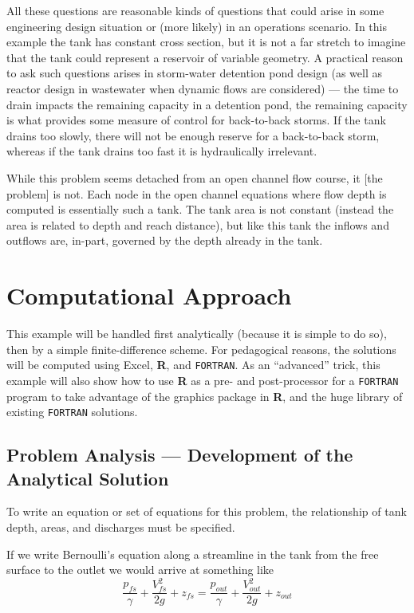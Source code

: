 \documentclass[12pt]{article}
\begin{document}
All these questions are reasonable kinds of questions that could arise in some engineering design situation or (more likely) in an operations scenario. In this example the tank has constant cross section, but it is not a far stretch to imagine that the tank could represent a reservoir of variable geometry.  A practical reason to ask such questions arises in storm-water detention pond design (as well as reactor design in wastewater when dynamic flows are considered) --- the time to drain impacts the remaining capacity in a detention pond, the remaining capacity is what provides some measure of control for back-to-back storms.  If the tank drains too slowly, there will not be enough reserve for a back-to-back storm, whereas if the tank drains too fast it is hydraulically irrelevant.

While this problem seems detached from an open channel flow course, it [the problem] is not.  Each node in the open channel equations where flow depth is computed is essentially such a tank.  The tank area is not constant (instead the area is related to depth and reach distance), but like this tank the inflows and outflows are, in-part, governed by the depth already in the tank.


\section{Computational Approach}
This example will be handled first analytically (because it is simple to do so), then by a simple finite-difference scheme.  For pedagogical reasons, the solutions will be computed using Excel, \textbf{R}, and \texttt{FORTRAN}.  As an ``advanced'' trick, this example will also show how to use \textbf{R} as a pre- and post-processor for a \texttt{FORTRAN} program to take advantage of the graphics package in \textbf{R}, and the huge library of existing \texttt{FORTRAN} solutions.

\subsection{Problem Analysis --- Development of the Analytical Solution}
To write an equation or set of equations for this problem, the relationship of tank depth, areas, and discharges must be specified.

If we write Bernoulli's equation along a streamline in the tank from the free surface to the outlet we would arrive at something like
\begin{equation}
\frac{p_{fs}}{\gamma}+\frac{V_{fs}^2}{2g}+z_{fs} = \frac{p_{out}}{\gamma}+\frac{V_{out}^2}{2g}+z_{out}
\label{eqn:tank_bernoulli}
\end{equation}
\end{document}
